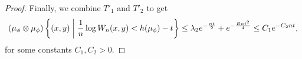 \begin{theorem}
\begin{proof}
		Finally, we combine $T'_1$ and $T'_2$ to get
		\[
			(\mu_\phi \otimes \mu_\phi)\left\{(x, y) \mathrel{}\middle|\mathrel{} \frac{1}{n}\log{W_n(x, y)} < h(\mu_\phi) - t\right\} \leq \lambda_2 e^{-\frac{nt}{2}} + e^{-\frac{Bnt^2}{4}} \leq C_1e^{-C_2 nt},
		\]
		for some constants $C_1, C_2 > 0$.
	\end{proof}
\end{theorem}
